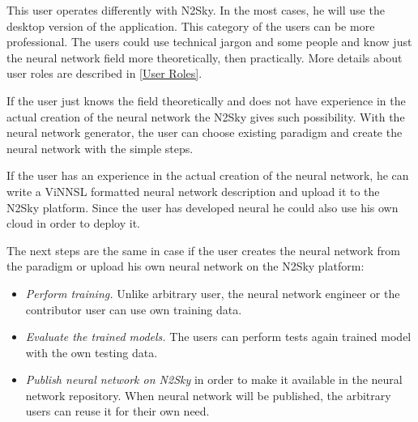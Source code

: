 This user operates differently with N2Sky. In the most cases, he will use the desktop version of the application. 
This category of the users can be more professional. The users could use technical jargon and some people and know just the neural network field more theoretically, then practically. More details about user roles are described in \autoref{User Roles}. 

If the user just knows the field theoretically and does not have experience in the actual creation of the neural network the N2Sky gives such possibility. With the neural network generator, the user can choose existing paradigm and create the neural network with the simple steps. 

If the user has an experience in the actual creation of the neural network, he can write a ViNNSL formatted neural network description and upload it to the N2Sky platform. Since the user has developed neural he could also use his own cloud in order to deploy it. 

The next steps are the same in case if the user creates the neural network from the paradigm or upload his own neural network on the N2Sky platform:

\begin{itemize}
\item \emph{Perform training.}  Unlike arbitrary user, the neural network engineer or the contributor user can use own training data. 
\item \emph{Evaluate the trained models.} The users can perform tests again trained model with the own testing data.
\item \emph{Publish neural network on N2Sky} in order to make it available in the neural network repository. When neural network will be published, the arbitrary users can reuse it for their own need. 
\end{itemize}


